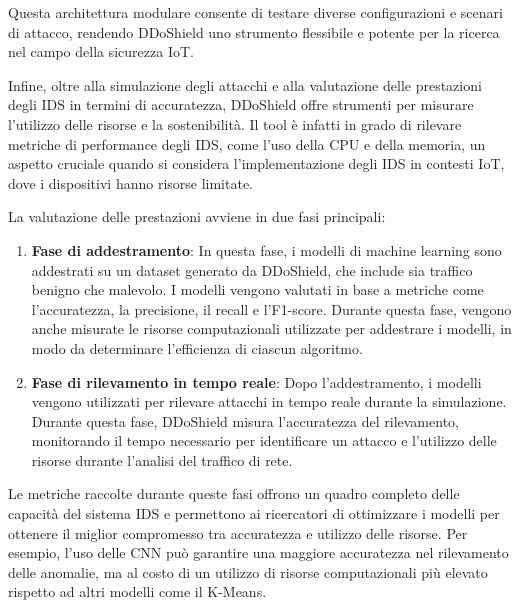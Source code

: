 Questa architettura modulare consente di testare diverse configurazioni e scenari di attacco, rendendo DDoShield uno strumento flessibile e potente per la ricerca nel campo della sicurezza IoT.

Infine, oltre alla simulazione degli attacchi e alla valutazione delle prestazioni degli IDS in termini di accuratezza, DDoShield offre strumenti per misurare l'utilizzo delle risorse e la sostenibilità. Il tool è infatti in grado di rilevare metriche di performance degli IDS, come l'uso della CPU e della memoria, un aspetto cruciale quando si considera l'implementazione degli IDS in contesti IoT, dove i dispositivi hanno risorse limitate.

La valutazione delle prestazioni avviene in due fasi principali:
\begin{enumerate}
    \item \textbf{Fase di addestramento}: In questa fase, i modelli di machine learning sono addestrati su un dataset generato da DDoShield, che include sia traffico benigno che malevolo. I modelli vengono valutati in base a metriche come l'accuratezza, la precisione, il recall e l'F1-score. Durante questa fase, vengono anche misurate le risorse computazionali utilizzate per addestrare i modelli, in modo da determinare l'efficienza di ciascun algoritmo.
    \item \textbf{Fase di rilevamento in tempo reale}: Dopo l'addestramento, i modelli vengono utilizzati per rilevare attacchi in tempo reale durante la simulazione. Durante questa fase, DDoShield misura l'accuratezza del rilevamento, monitorando il tempo necessario per identificare un attacco e l'utilizzo delle risorse durante l'analisi del traffico di rete.
\end{enumerate}

Le metriche raccolte durante queste fasi offrono un quadro completo delle capacità del sistema IDS e permettono ai ricercatori di ottimizzare i modelli per ottenere il miglior compromesso tra accuratezza e utilizzo delle risorse. Per esempio, l'uso delle CNN può garantire una maggiore accuratezza nel rilevamento delle anomalie, ma al costo di un utilizzo di risorse computazionali più elevato rispetto ad altri modelli come il K-Means.
\cite{DDoShield}